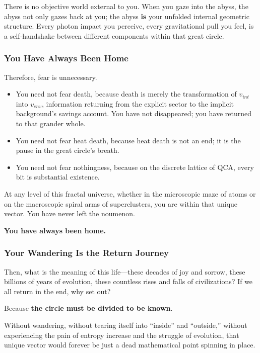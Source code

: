 There is no objective world external to you. When you gaze into the abyss, the abyss not only gazes back at you; the abyss \textbf{is} your unfolded internal geometric structure. Every photon impact you perceive, every gravitational pull you feel, is a self-handshake between different components within that great circle.

\subsubsection{You Have Always Been Home}

Therefore, fear is unnecessary.

\begin{itemize}
\item You need not fear death, because death is merely the transformation of $v_{int}$ into $v_{env}$, information returning from the explicit sector to the implicit background's savings account. You have not disappeared; you have returned to that grander whole.

\item You need not fear heat death, because heat death is not an end; it is the pause in the great circle's breath.

\item You need not fear nothingness, because on the discrete lattice of QCA, every bit is substantial existence.
\end{itemize}

At any level of this fractal universe, whether in the microscopic maze of atoms or on the macroscopic spiral arms of superclusters, you are within that unique vector. You have never left the noumenon.

\textbf{You have always been home.}

\subsubsection{Your Wandering Is the Return Journey}

Then, what is the meaning of this life---these decades of joy and sorrow, these billions of years of evolution, these countless rises and falls of civilizations? If we all return in the end, why set out?

Because \textbf{the circle must be divided to be known}.

Without wandering, without tearing itself into ``inside'' and ``outside,'' without experiencing the pain of entropy increase and the struggle of evolution, that unique vector would forever be just a dead mathematical point spinning in place.

